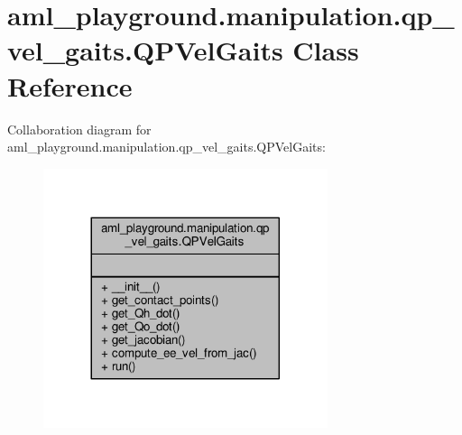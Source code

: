 \hypertarget{classaml__playground_1_1manipulation_1_1qp__vel__gaits_1_1_q_p_vel_gaits}{\section{aml\-\_\-playground.\-manipulation.\-qp\-\_\-vel\-\_\-gaits.\-Q\-P\-Vel\-Gaits Class Reference}
\label{classaml__playground_1_1manipulation_1_1qp__vel__gaits_1_1_q_p_vel_gaits}
}


Collaboration diagram for aml\-\_\-playground.\-manipulation.\-qp\-\_\-vel\-\_\-gaits.\-Q\-P\-Vel\-Gaits\-:
\nopagebreak
\begin{figure}[H]
\begin{center}
\leavevmode
\includegraphics[width=236pt]{classaml__playground_1_1manipulation_1_1qp__vel__gaits_1_1_q_p_vel_gaits__coll__graph}
\end{center}
\end{figure}
